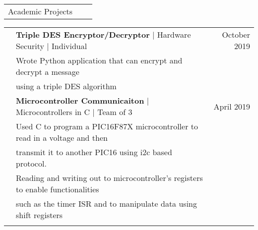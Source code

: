 \documentclass[letterpaper,10pt,oneside]{article}
\begin{document}
 \noindent \begin{tabularx}{\linewidth}{@{} l l R } 
     \Large{Academic Projects}\\
 \end{tabularx}
 \noindent \begin{tabularx}{\linewidth}{@{} l l R } 
     & \textbf{Triple DES Encryptor/Decryptor} $\mid$ Hardware Security $\mid$ Individual & October 2019 \\
     &Wrote Python application that can encrypt and decrypt a message\\
     &\indent using a triple DES algorithm\\
     & \textbf{Microcontroller Communicaiton} $\mid$ Microcontrollers in C $\mid$ Team of 3 & April 2019 \\
     &  Used C to program a PIC16F87X microcontroller to read in a voltage and then \\
     &\indent transmit it to another PIC16 using i2c based protocol.\\
     & Reading and writing out to microcontroller's registers to enable functionalities \\
     &\indent such as the timer ISR and to manipulate data using shift registers\\
     \\
\end{tabularx}
\end{document}

